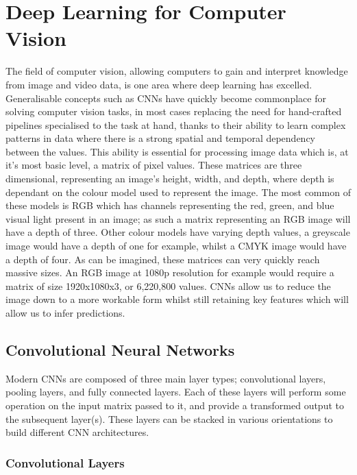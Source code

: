 \section{Deep Learning for Computer Vision}\label{ch:Background,sec:DLforCV}

The field of computer vision, allowing computers to gain and interpret knowledge from image and video data, is one area where deep learning has excelled. Generalisable concepts such as CNNs have quickly become commonplace for solving computer vision tasks, in most cases replacing the need for hand-crafted pipelines specialised to the task at hand, thanks to their ability to learn complex patterns in data where there is a strong spatial and temporal dependency between the values. This ability is essential for processing image data which is, at it's most basic level, a matrix of pixel values. These matrices are three dimensional, representing an image's height, width, and depth, where depth is dependant on the colour model used to represent the image. The most common of these models is RGB which has channels representing the red, green, and blue visual light present in an image; as such a matrix representing an RGB image will have a depth of three. Other colour models have varying depth values, a greyscale image would have a depth of one for example, whilst a CMYK image would have a depth of four. As can be imagined, these matrices can very quickly reach massive sizes. An RGB image at 1080p resolution for example would require a matrix of size 1920x1080x3, or 6,220,800 values. CNNs allow us to reduce the image down to a more workable form whilst still retaining key features which will allow us to infer predictions.

\subsection{Convolutional Neural Networks}\label{ch:Background,sec:CNN,sub:CNN}
Modern CNNs are composed of three main layer types; convolutional layers, pooling layers, and fully connected layers. Each of these layers will perform some operation on the input matrix passed to it, and provide a transformed output to the subsequent layer(s). These layers can be stacked in various orientations to build different CNN architectures.

\subsubsection{Convolutional Layers}\label{ch:Background,sec:CNN,sub:CNN,subsub:convolution}

